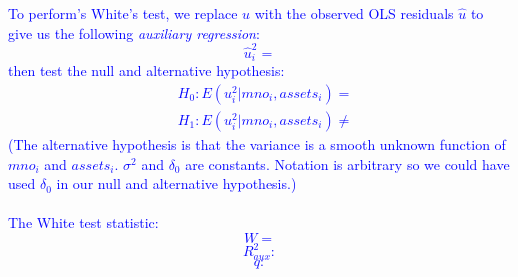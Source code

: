 \documentclass[12pt]{report}
\newenvironment{blueframed}[1][blue]
{\def\FrameCommand{\fboxsep=\FrameSep\fcolorbox{#1}{white}}%
\MakeFramed {\advance\hsize-\width \FrameRestore}}
{\endMakeFramed}
\begin{document}
\begin{blueframed}
	\vspace{-\baselineskip}
	\justify
	\noindent \textcolor{blue}
	{	To perform's White's test, we replace $u$ with the observed OLS residuals $\hat{u}$ to give us the following \textit{auxiliary regression}: $$\hat{u}^2_i = $$ then test the null and alternative hypothesis: \begin{align*}
		&H_0: E(u^2_i|mno_i,assets_i) =  \\
		&H_1: E(u^2_i|mno_i,assets_i) \neq 
		\end{align*} (The alternative hypothesis is that the variance is a smooth unknown function of $mno_i$ and $assets_i$. $\sigma^2$ and $\delta_0$ are constants. Notation is arbitrary so we could have used $\delta_0$ in our null and alternative hypothesis.) \\ \\
		The White test statistic:
		$$W = $$ $$R^2_{aux}: $$ $$q:$$
	}
\end{blueframed}
\end{document}
